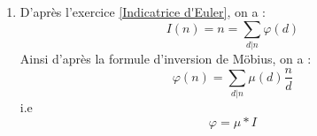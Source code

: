 \documentclass[8pt]{book}
\begin{document}
\begin{enumerate}
		\begin{align*}
			\sum_{d|n}\mu(d)F\!\left(\frac{n}{d}\right)
			&= \sum_{d|n}\mu(d)\sum_{d'\mid\frac{n}{d}}f(d')\\
			&= \sum_{d|n}\sum_{d'\mid\frac{n}{d}}\mu(d)f(d')\\
			&= \sum_{d'\mid n}\sum_{d\mid\frac{n}{d'}}\mu(d)f(d') 
			&& \text{(d'après l'équivalence précédente)}\\
			&= \sum_{d'\mid n} f(d') \sum_{d\mid\frac{n}{d'}}\mu(d)
		\end{align*}
		D'après la question 2, \[\sum_{d|\frac{n}{d'}}\mu(d)\ne 0 \Longleftrightarrow d'=n\]
		Par conséquent, on en déduit bien l'égalité souhaité : \[f(n)=\sum_{d|n}\mu(d)F(\frac{n}{d})\]
		\item D'après l'exercice \ref{Indicatrice d'Euler}, on a : \[I(n)=n=\sum_{d|n}\varphi(d)\]
		Ainsi d'après la formule d'inversion de Möbius, on a :
		\[\varphi(n)=\sum_{d|n}\mu(d)\frac{n}{d}\]
		i.e \[\varphi=\mu*I\]
	\end{enumerate}
	
\end{document}
